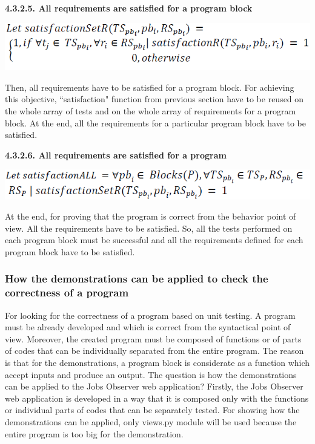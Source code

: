 \documentclass[conference,compsoc]{IEEEtran}
\begin{document}
\noindent
\newline
\textbf{4.3.2.5. All requirements are satisfied for a program block}
\begin{center}
\includegraphics[scale=0.5]{Proof2-Part5.png} 
\end{center}

Then, all requirements have to be satisfied for a program block. For achieving this objective, ``satisfaction" function from previous section have to be reused on the whole array of tests and on the whole array of requirements for a program block. At the end, all the requirements for a particular program block have to be satisfied. 

\noindent
\newline
\textbf{4.3.2.6. All requirements are satisfied for a program}
\begin{center}
\includegraphics[scale=0.5]{Proof2-Part6.png} 
\end{center}

At the end, for proving that the program is correct from the behavior point of view. All the requirements have to be satisfied. So, all the tests performed on each program block must be successful and all the requirements defined for each program block have to be satisfied. 

\subsubsection{How the demonstrations can be applied to check the correctness of a program}
For looking for the correctness of a program based on unit testing. A program must be already developed and which is correct from the syntactical point of view. Moreover, the created program must be composed of functions or of parts of codes that can be individually separated from the entire program. The reason is that for the demonstrations, a program block is considerate as a function which accept inputs and produce an output.
\newline 
The question is how the demonstrations can be applied to the Jobs Observer web application?
\newline                                                         
Firstly, the Jobs Observer web application is developed in a way that it is composed only with the functions or individual parts of codes that can be separately tested. For showing how the demonstrations can be applied, only views.py module will be used because the entire program is too big for the demonstration. 
\end{document}
